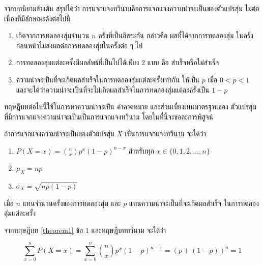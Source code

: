 จากบทนิยามข้างต้น สรุปได้ว่า การแจกแจงทวินามคือการแจกแจงความน่าจะเป็นของตัวแปรสุ่ม ไม่ต่อเนื่องที่มีลักษณะดังต่อไปนี้

\begin{enumerate}
	\item เกิดจากการทดลองสุ่มจำนวน $n$ ครั้งที่เป็นอิสระกัน กล่าวคือ ผลที่ได้จากการทดลองสุ่ม ในครั้งก่อนหน้าไม่ส่งผลต่อการทดลองสุ่มในครั้งต่อ ๆ ไป
	\item การทดลองสุ่มแต่ละครั้งมีผลลัพธ์ที่เป็นไปได้เพียง 2 แบบ คือ สำเร็จหรือไม่สำเร็จ
	\item ความน่าจะเป็นที่จะเกิดผลสำเร็จในการทดลองสุ่มแต่ละครั้งเท่ากัน ให้เป็น $p$ เมื่อ $0<p<1$ และจะได้ว่าความน่าจะเป็นที่จะไม่เกิดผลสำเร็จในการทดลองสุ่มแต่ละครั้งเป็น $1-p$
\end{enumerate}

ทฤษฎีบทต่อไปนี้ใช้ในการหาความน่าจะเป็น ค่าคาดหมาย และส่วนเบี่ยงเบนมาตรฐานของ ตัวแปรสุ่มที่มีการแจกแจงความน่าจะเป็นเป็นการแจกแจงทวินาม โดยในที่นี้จะขอละการพิสูจน์

\begin{theorembox} \label{theorem1}
	ถ้าการแจกแจงความน่าจะเป็นของตัวแปรสุ่ม $X$ เป็นการแจกแจงทวินาม จะได้ว่า
	
	\begin{enumerate}
		\item $P(X=x)=\displaystyle\binom{n}{x} p^{x}(1-p)^{n-x}$ สำหรับทุก $x \in\{0,1,2, \ldots, n\}$
		\item $\mu_{X}=n p$
		\item $\sigma_{X}=\sqrt{n p(1-p)}$
	\end{enumerate}
	
	เมื่อ $n$ แทนจำนวนครั้งของการทดลองสุ่ม และ $p$ แทนความน่าจะเป็นที่จะเกิดผลสำเร็จ ในการทดลองสุ่มแต่ละครั้ง
\end{theorembox}
\remark จากทฤษฎีบท \ref{theorem1} ข้อ 1 และทฤษฎีบททวินาม จะได้ว่า

$$
\sum_{x=0}^{n} P(X=x)=\sum_{x=0}^{n}\binom{n}{x} p^{x}(1-p)^{n-x}=(p+(1-p))^{n}=1
$$

